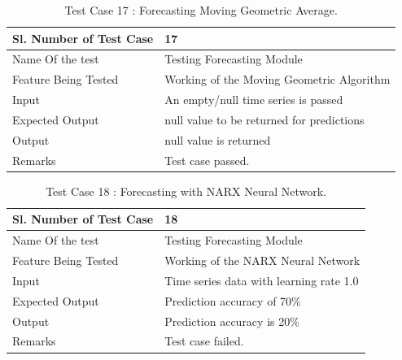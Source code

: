 \documentclass[12pt,a4paper]{report}
\begin{document}
\begin{table}
    \begin{tabular}{|l|l|}
    \hline
    Sl. Number of Test Case & 17                            \\ \hline
    Name Of the test        & Testing Forecasting Module     \\ \hline
    Feature Being Tested    & Working of the Moving Geometric Algorithm \\ \hline
    Input                   & An empty/null time series is passed\\ \hline
    Expected Output         & null value to be returned for predictions \\ \hline
    Output                  & null value is returned \\ \hline
    Remarks                 & Test case passed.             \\ \hline
    \end{tabular}
    \caption {Test Case 17 : Forecasting Moving Geometric Average.}
\end{table}

\begin{table}
    \begin{tabular}{|l|l|}
    \hline
    Sl. Number of Test Case & 18                            \\ \hline
    Name Of the test        & Testing Forecasting Module     \\ \hline
    Feature Being Tested    & Working of the NARX Neural Network \\ \hline
    Input                   & Time series data with learning rate 1.0\\ \hline
    Expected Output         & Prediction accuracy of 70\% \\ \hline
    Output                  & Prediction accuracy is 20\% \\ \hline
    Remarks                 & Test case failed.             \\ \hline
    \end{tabular}
    \caption {Test Case 18 : Forecasting with NARX Neural Network.}
\end{table}

\pagestyle{fancy}
\chead{}
\rfoot{\small{\thepage}}
\renewcommand{\headrulewidth}{0.4pt}
\renewcommand{\footrulewidth}{0.4pt}
\end{document}
